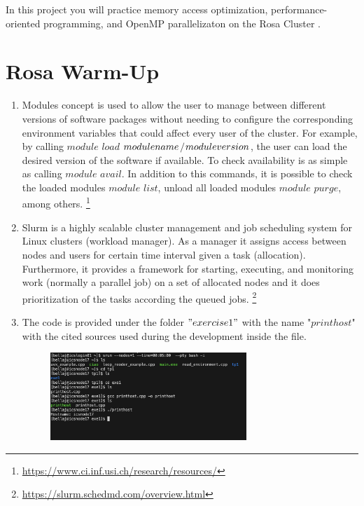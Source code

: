 \documentclass[unicode,11pt,a4paper,oneside,numbers=endperiod,openany]{scrartcl}
\begin{document}
\setassignment

\newline

\assignmentpolicy
In this project you will practice memory access optimization, performance-oriented programming, and OpenMP parallelizaton 
on the Rosa Cluster .  

\section{Rosa Warm-Up }
\begin{enumerate}
\item Modules concept is used to allow the user to manage between different versions of software packages without needing to configure the corresponding 
environment variables that could affect every user of the cluster. For example, by calling $module$ $load$ $module\-name$$/$$module\-version$, the user can load the desired version of the software if available.
To check availability is as simple as calling $module$ $avail$. In addition to this commands, it is possible to check the loaded modules $module$ $list$, unload all loaded modules $module$ $purge$, among others. \footnote{\url{https://www.ci.inf.usi.ch/research/resources/}}
\item Slurm is a highly scalable cluster management and job scheduling system for Linux clusters (workload manager). As a manager it assigns access between nodes and users for certain time interval given a task (allocation). 
Furthermore, it provides a framework for starting, executing, and monitoring work (normally a parallel job) on a set of allocated nodes and it does prioritization of the tasks according the queued jobs.
\footnote{\url{https://slurm.schedmd.com/overview.html}}
\item The code is provided under the folder $"exercise1"$ with the name "$printhost$" with the cited sources used during the development inside the file.
\begin{figure}[h]
    \centering
    \includegraphics[width=0.7\textwidth]{./exercise1/exe1-3.png}

\end{figure}
\end{enumerate}
\end{document}
